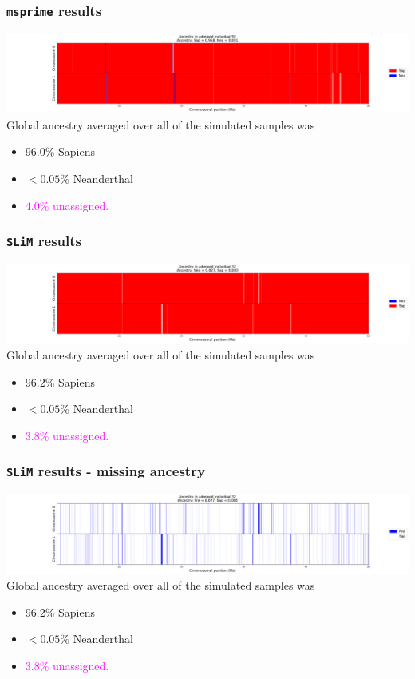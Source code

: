 \documentclass[11pt, mathserif, aspectratio=169]{beamer}
\newcommand{\magenta}[1]{\textcolor{magenta}{#1}}
\begin{document}
\begin{frame}
\frametitle{\texttt{msprime} results}
\includegraphics[scale=.22]{pics/msprime/msprime-sample.png}\quad\quad
Global ancestry averaged over all of the simulated samples was 
\begin{itemize}
\item $96.0\%$ Sapiens
\item $<0.05\%$ Neanderthal
\item \magenta{$4.0\%$ unassigned.}
\end{itemize}
\end{frame}

\begin{frame}
\frametitle{\texttt{SLiM} results}
\includegraphics[scale=.22]{pics/slim-sample.png}\quad\quad
Global ancestry averaged over all of the simulated samples was 
\begin{itemize}
\item $96.2\%$ Sapiens
\item $<0.05\%$ Neanderthal
\item \magenta{$3.8\%$ unassigned.}
\end{itemize}
\end{frame}

\begin{frame}
\frametitle{\texttt{SLiM} results - missing ancestry}
\includegraphics[scale=.22]{pics/slim-sample-missing.png}\quad\quad
Global ancestry averaged over all of the simulated samples was 
\begin{itemize}
\item $96.2\%$ Sapiens
\item $<0.05\%$ Neanderthal
\item \magenta{$3.8\%$ unassigned.}
\end{itemize}
\end{frame}
\end{document}
